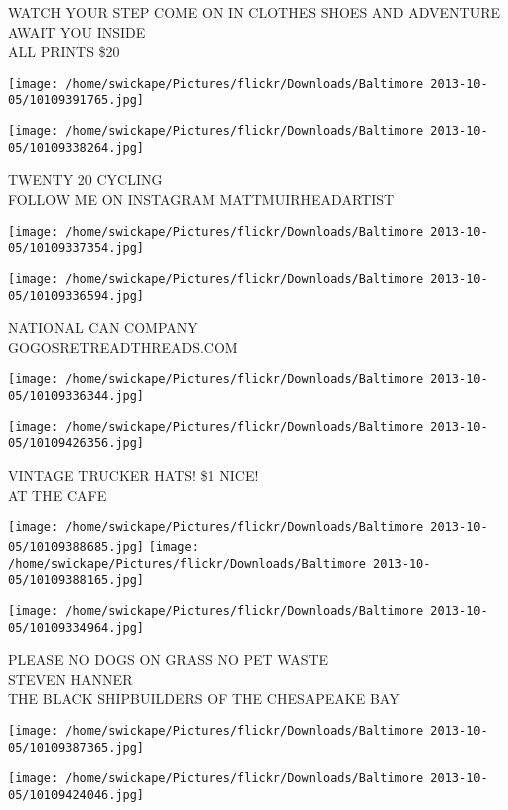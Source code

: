 \documentclass[10pt,letterpaper]{article}
\begin{document}
WATCH YOUR STEP COME ON IN CLOTHES SHOES AND ADVENTURE AWAIT YOU INSIDE\\
ALL PRINTS \$20
\pagebreak

\texttt{[image: /home/swickape/Pictures/flickr/Downloads/Baltimore 2013-10-05/10109391765.jpg]}

\vspace{0.25in}
\texttt{[image: /home/swickape/Pictures/flickr/Downloads/Baltimore 2013-10-05/10109338264.jpg]}

TWENTY 20 CYCLING\\
FOLLOW ME ON INSTAGRAM MATTMUIRHEADARTIST
\pagebreak

\texttt{[image: /home/swickape/Pictures/flickr/Downloads/Baltimore 2013-10-05/10109337354.jpg]}

\vspace{0.25in}
\texttt{[image: /home/swickape/Pictures/flickr/Downloads/Baltimore 2013-10-05/10109336594.jpg]}

NATIONAL CAN COMPANY\\
GOGOSRETREADTHREADS.COM
\pagebreak

\texttt{[image: /home/swickape/Pictures/flickr/Downloads/Baltimore 2013-10-05/10109336344.jpg]}

\vspace{0.25in}
\texttt{[image: /home/swickape/Pictures/flickr/Downloads/Baltimore 2013-10-05/10109426356.jpg]}

VINTAGE TRUCKER HATS! \$1 NICE!\\
AT THE CAFE
\pagebreak

\texttt{[image: /home/swickape/Pictures/flickr/Downloads/Baltimore 2013-10-05/10109388685.jpg]}
\texttt{[image: /home/swickape/Pictures/flickr/Downloads/Baltimore 2013-10-05/10109388165.jpg]}

\vspace{0.25in}
\texttt{[image: /home/swickape/Pictures/flickr/Downloads/Baltimore 2013-10-05/10109334964.jpg]}

PLEASE NO DOGS ON GRASS NO PET WASTE\\
STEVEN HANNER\\
THE BLACK SHIPBUILDERS OF THE CHESAPEAKE BAY
\pagebreak

\texttt{[image: /home/swickape/Pictures/flickr/Downloads/Baltimore 2013-10-05/10109387365.jpg]}

\vspace{0.25in}
\texttt{[image: /home/swickape/Pictures/flickr/Downloads/Baltimore 2013-10-05/10109424046.jpg]}
\end{document}
